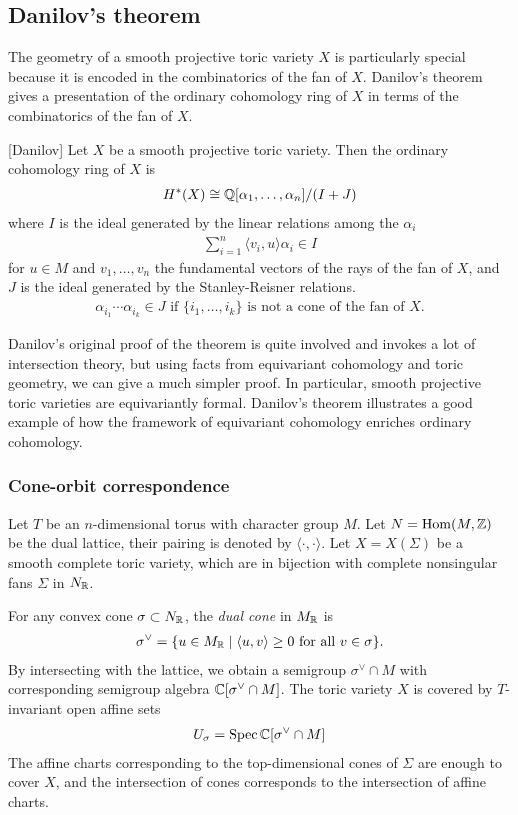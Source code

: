 \subsection{Danilov's theorem}
The geometry of a smooth projective toric variety $X$ is particularly special because it is encoded in the combinatorics of the fan of $X$.
Danilov's theorem gives a presentation of the ordinary cohomology ring of $X$ in terms of the
combinatorics of the fan of $X$.
\begin{theorem}\label{thm:danilov}
	[Danilov]
	Let $X$ be a smooth projective toric variety. Then the ordinary cohomology ring
	of $X$ is \begin{align*}
		H^*(X)\cong \mathbb{Q}[\alpha_1,\ldots,\alpha_n]/(I+J)
	\end{align*} where $I$ is the ideal generated by the linear relations among the
	$\alpha_i$
	\begin{align*}
		\sum_{i=1}^n \langle v_i,u\rangle \alpha_i \in I
	\end{align*} for $u\in M$ and $v_1,\ldots,v_n$ the fundamental
	vectors of the rays of the fan of $X$,
	and $J$ is the ideal generated by the Stanley-Reisner relations. \begin{align*}
		\alpha_{i_1}\cdots\alpha_{i_k}\in J \text{ if } \{i_1,\ldots,i_k\} \text{ is not a cone of the fan of } X.
	\end{align*}
\end{theorem}

Danilov's original proof of the theorem is quite involved and invokes
a lot of intersection theory, but using facts from equivariant cohomology
and toric geometry, we can give a much simpler proof. In particular,
smooth projective toric varieties are equivariantly formal. Danilov's theorem illustrates a good example of how the framework of equivariant cohomology enriches ordinary cohomology.

\subsubsection{Cone-orbit correspondence}
Let $T$ be an $n$-dimensional torus with character group $M$. Let $N = \operatorname{Hom}(M,\mathbb{Z})$ be the
dual lattice, their pairing is denoted by $\langle \cdot,\cdot\rangle$. Let $X = X(\Sigma)$ be a smooth complete toric variety, which are in bijection with complete nonsingular fans $\Sigma$ in $N_{\mathbb{R}}$.

For any convex cone $\sigma \subset N_{\mathbb{R}}$, the \emph{dual cone} in $M_{\mathbb{R}}$ is \begin{align*}
	\sigma^\vee = \{u\in M_{\mathbb{R}} \mid \langle u,v\rangle \geq 0 \text{ for all } v\in \sigma\}.
\end{align*} By intersecting with the lattice, we obtain a semigroup $\sigma^\vee \cap M$
with corresponding semigroup algebra $\mathbb{C}[\sigma^\vee \cap M]$. The toric variety $X$
is covered by $T$-invariant open affine sets \begin{align*}
	U_\sigma = \operatorname{Spec} \mathbb{C}[\sigma^\vee \cap M]
\end{align*} The affine charts corresponding to the top-dimensional cones of $\Sigma$
are enough to cover $X$, and the intersection of cones corresponds to the intersection of
affine charts.

